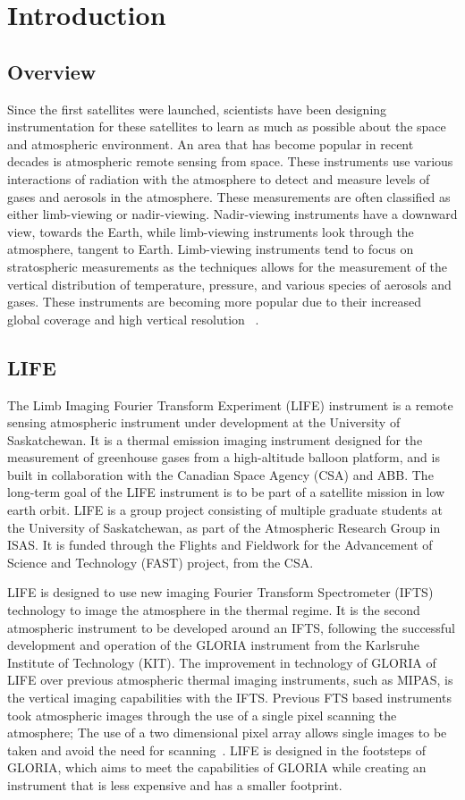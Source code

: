 \chapter{Introduction}

\section{Overview}
Since the first satellites were launched, scientists have been designing instrumentation for these satellites to learn as much as possible about the space and atmospheric environment. An area that has become popular in recent decades is atmospheric remote sensing from space. These instruments use various interactions of radiation with the atmosphere to detect and measure levels of gases and aerosols in the atmosphere. These measurements are often classified as either limb-viewing or nadir-viewing. Nadir-viewing instruments have a downward view, towards the Earth, while limb-viewing instruments look through the atmosphere, tangent to Earth. Limb-viewing instruments tend to focus on stratospheric measurements as the techniques allows for the measurement of the vertical distribution of temperature, pressure, and various species of aerosols and gases. These instruments are becoming more popular due to their increased global coverage and high vertical resolution ~\citep{SPARC}.

\section{LIFE}
The Limb Imaging Fourier Transform Experiment (LIFE) instrument is a remote sensing atmospheric instrument under development at the University of Saskatchewan. It is a thermal emission imaging instrument designed for the measurement of greenhouse gases from a high-altitude balloon platform, and is built in collaboration with the Canadian Space Agency (CSA) and ABB. The long-term goal of the LIFE instrument is to be part of a satellite mission in low earth orbit. LIFE is a group project consisting of multiple graduate students at the University of Saskatchewan, as part of the Atmospheric Research Group in ISAS. It is funded through the Flights and Fieldwork for the Advancement of Science and Technology (FAST) project, from the CSA. 

LIFE is designed to use new imaging Fourier Transform Spectrometer (IFTS) technology to image the atmosphere in the thermal regime. It is the second atmospheric instrument to be developed around an IFTS, following the successful development and operation of the GLORIA instrument from the Karlsruhe Institute of Technology (KIT). The improvement in technology of GLORIA of LIFE over previous atmospheric thermal imaging instruments, such as MIPAS, is the vertical imaging capabilities with the IFTS. Previous FTS based instruments took atmospheric images through the use of a single pixel scanning the atmosphere; The use of a two dimensional pixel array allows single images to be taken and avoid the need for scanning~\citep{GLORIA_objectives}. LIFE is designed in the footsteps of GLORIA, which aims to meet the capabilities of GLORIA while creating an instrument that is less expensive and has a smaller footprint. 

